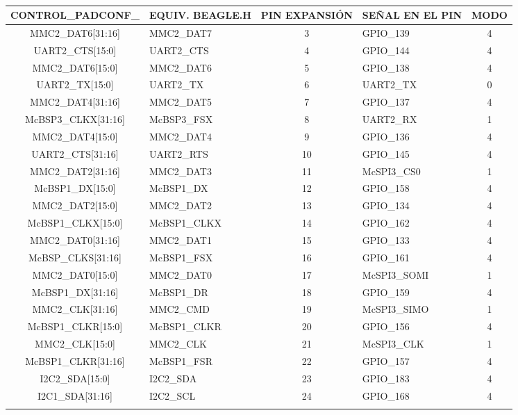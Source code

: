 \begin{longtable}{|c|p{2.6cm}|c|p{2.5cm}|c|}
\hline
\textbf{CONTROL\_PADCONF\_} & \textbf{EQUIV. BEAGLE.H} & \textbf{PIN EXPANSIÓN} & \textbf{SEÑAL EN EL PIN} & \textbf{MODO} \\ \hline
MMC2\_DAT6[31:16] & MMC2\_DAT7 & 3 & GPIO\_139 & 4 \\ \hline
UART2\_CTS[15:0] & UART2\_CTS & 4 & GPIO\_144 & 4 \\ \hline
MMC2\_DAT6[15:0] & MMC2\_DAT6 & 5 & GPIO\_138 & 4 \\ \hline
UART2\_TX[15:0] & UART2\_TX & 6 & UART2\_TX & 0 \\ \hline
MMC2\_DAT4[31:16] & MMC2\_DAT5 & 7 & GPIO\_137 & 4 \\ \hline
McBSP3\_CLKX[31:16] & McBSP3\_FSX & 8 & UART2\_RX & 1 \\ \hline
MMC2\_DAT4[15:0] & MMC2\_DAT4 & 9 & GPIO\_136 & 4 \\ \hline
UART2\_CTS[31:16] & UART2\_RTS & 10 & GPIO\_145 & 4 \\ \hline
MMC2\_DAT2[31:16] & MMC2\_DAT3 & 11 & McSPI3\_CS0 & 1 \\ \hline
McBSP1\_DX[15:0] & McBSP1\_DX & 12 & GPIO\_158 & 4 \\ \hline
MMC2\_DAT2[15:0] & MMC2\_DAT2 & 13 & GPIO\_134 & 4 \\ \hline
McBSP1\_CLKX[15:0] & McBSP1\_CLKX & 14 & GPIO\_162 & 4 \\ \hline
MMC2\_DAT0[31:16] & MMC2\_DAT1 & 15 & GPIO\_133 & 4 \\ \hline
McBSP\_CLKS[31:16] & McBSP1\_FSX & 16 & GPIO\_161 & 4 \\ \hline
MMC2\_DAT0[15:0] & MMC2\_DAT0 & 17 & McSPI3\_SOMI & 1 \\ \hline
McBSP1\_DX[31:16] & McBSP1\_DR & 18 & GPIO\_159 & 4 \\ \hline
MMC2\_CLK[31:16] & MMC2\_CMD & 19 & McSPI3\_SIMO & 1 \\ \hline
McBSP1\_CLKR[15:0] & McBSP1\_CLKR & 20 & GPIO\_156 & 4 \\ \hline
MMC2\_CLK[15:0] & MMC2\_CLK & 21 & McSPI3\_CLK & 1 \\ \hline
McBSP1\_CLKR[31:16] & McBSP1\_FSR & 22 & GPIO\_157 & 4 \\ \hline
I2C2\_SDA[15:0] & I2C2\_SDA & 23 & GPIO\_183 & 4 \\ \hline
I2C1\_SDA[31:16] & I2C2\_SCL & 24 & GPIO\_168 & 4 \\ \hline
\caption{}\label{}
\end{longtable}




